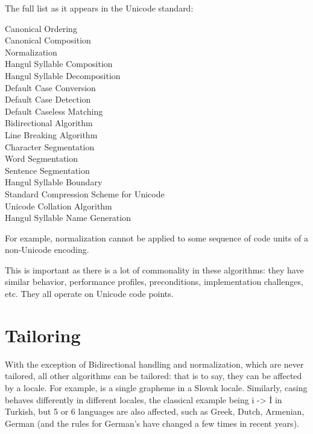 \documentclass{wg21}
\begin{document}
The full list as it appears in the Unicode standard:
\begin{quoteblock}
Canonical Ordering\\
Canonical Composition\\
Normalization\\
Hangul Syllable Composition\\
Hangul Syllable Decomposition\\


Default Case Conversion\\
Default Case Detection\\
Default Caseless Matching\\

Bidirectional Algorithm\\

Line Breaking Algorithm\\
Character Segmentation\\
Word Segmentation\\
Sentence Segmentation\\
Hangul Syllable Boundary\\

Standard Compression Scheme for Unicode\\

Unicode Collation Algorithm\\

Hangul Syllable Name Generation\\
\end{quoteblock}

For example, normalization cannot be applied to some sequence of code units of a non-Unicode encoding.

This is important as there is a lot of commonality in these algorithms: they have similar behavior, performance profiles, preconditions, implementation challenges, etc.
They all operate on Unicode code points.

\section{Tailoring}

With the exception of Bidirectional handling and normalization, which are never tailored, all other algorithms can be tailored: that is to say, they can be affected
by a locale. For example,  is a single grapheme in a Slovak locale. Similarly, casing behaves differently in different locales, the classical example being i -> İ
in Turkish, but 5 or 6 languages are also affected, such as Greek, Dutch, Armenian, German (and the rules for German's  have changed a few times in recent years).
\end{document}

